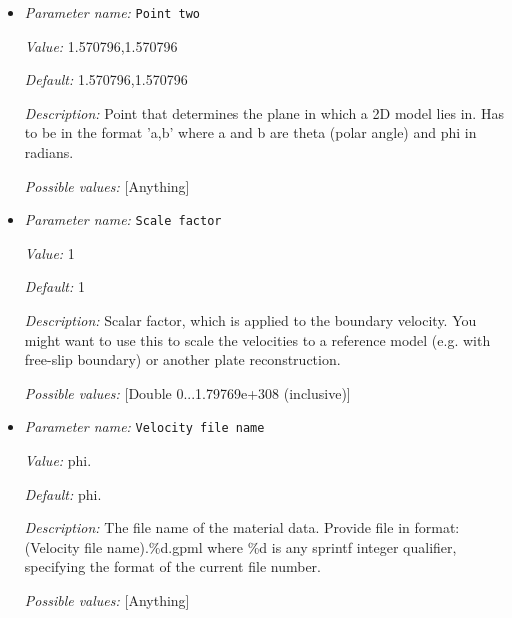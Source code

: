 \begin{itemize}
{\it Value:} 1.570796,0.0


{\it Default:} 1.570796,0.0


{\it Description:} Point that determines the plane in which a 2D model lies in. Has to be in the format 'a,b' where a and b are theta (polar angle)  and phi in radians.


{\it Possible values:} [Anything]
\item {\it Parameter name:} {\tt Point two}
\label{parameters:Boundary velocity model/GPlates model/Point two}


{\it Value:} 1.570796,1.570796


{\it Default:} 1.570796,1.570796


{\it Description:} Point that determines the plane in which a 2D model lies in. Has to be in the format 'a,b' where a and b are theta (polar angle)  and phi in radians.


{\it Possible values:} [Anything]
\item {\it Parameter name:} {\tt Scale factor}
\label{parameters:Boundary velocity model/GPlates model/Scale factor}


{\it Value:} 1


{\it Default:} 1


{\it Description:} Scalar factor, which is applied to the boundary velocity. You might want to use this to scale the velocities to a reference model (e.g. with free-slip boundary) or another plate reconstruction.


{\it Possible values:} [Double 0...1.79769e+308 (inclusive)]
\item {\it Parameter name:} {\tt Velocity file name}
\label{parameters:Boundary velocity model/GPlates model/Velocity file name}


{\it Value:} phi.%


{\it Default:} phi.%


{\it Description:} The file name of the material data. Provide file in format: (Velocity file name).\%d.gpml where \%d is any sprintf integer qualifier, specifying the format of the current file number.


{\it Possible values:} [Anything]
\end{itemize}

